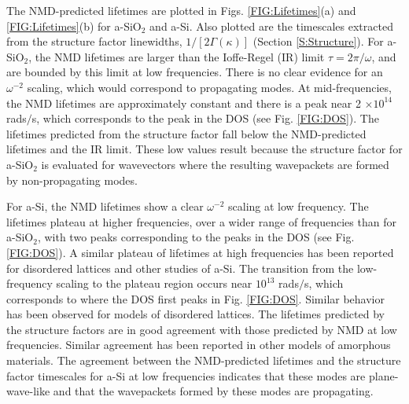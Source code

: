 The NMD-predicted lifetimes are plotted in Figs. 
\ref{FIG:Lifetimes}(a) and \ref{FIG:Lifetimes}(b) 
for a-SiO$_2$ and a-Si. 
Also plotted are the timescales extracted from the structure 
factor linewidths, $1/[2\Gamma(\kappa)]$ (Section \ref{S:Structure}). 
For a-SiO$_2$, the NMD lifetimes are larger than 
the Ioffe-Regel (IR) limit $\tau = 2\pi/\omega$,
\cite{taraskin_determination_1999} and are bounded by  
this limit at low frequencies. There is no clear evidence for an 
$\omega^{-2}$ scaling, which would correspond to propagating modes.  
At mid-frequencies, the NMD lifetimes are approximately constant and  
there is a peak near 2 $\times 10^{14}$ rads$/$s, which corresponds to 
the peak in the DOS (see Fig. \ref{FIG:DOS}). 
The lifetimes predicted from the 
structure factor fall below the NMD-predicted lifetimes 
and the IR limit. These low values result because the structure factor 
for a-SiO$_2$ is evaluated for wavevectors where the resulting 
wavepackets are formed by non-propagating modes.
\cite{feldman_thermal_1993,feldman_numerical_1999,allen_diffusons_1999}

For a-Si, the NMD lifetimes show a clear $\omega^{-2}$ 
scaling at low frequency. 
The lifetimes plateau at higher frequencies,
over a wider range of frequencies than for a-SiO$_2$, with two peaks 
corresponding to the peaks in the DOS (see Fig. \ref{FIG:DOS}). 
A similar plateau of lifetimes at high frequencies has been 
reported for disordered lattices
\cite{sheng_heat_1991,he_lattice_2012,larkin_predicting_2013} and 
other studies of a-Si.\cite{he_heat_2011} 
The transition from the low-frequency scaling to 
the plateau region occurs near 
$10^{13}$ rads$/$s, which corresponds to where the DOS first peaks 
in Fig. \ref{FIG:DOS}. 
Similar behavior has been observed for models of disordered lattices.
\cite{larkin_predicting_2013} The lifetimes predicted by the 
structure factors are in good agreement with those predicted by NMD 
at low frequencies. Similar agreement has been reported in other 
models of amorphous materials.
\cite{mazzacurati_low-frequency_1996,bickham_calculation_1998,
bickham_numerical_1999,feldman_numerical_1999} 
The agreement between the 
NMD-predicted lifetimes and the structure factor timescales for a-Si 
at low frequencies indicates that these modes are plane-wave-like 
and that the wavepackets formed by these modes are propagating.
\cite{feldman_thermal_1993,feldman_numerical_1999,allen_diffusons_1999}

